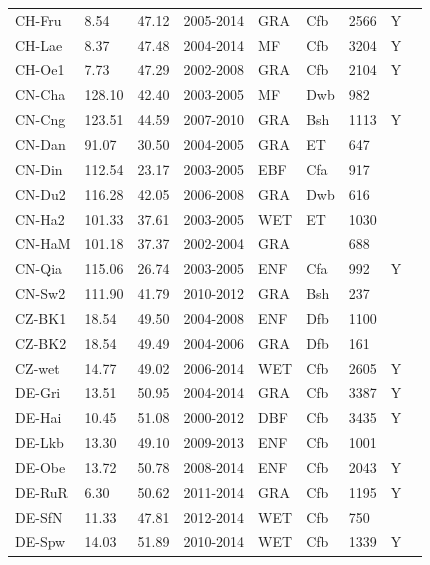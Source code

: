 \documentclass{myreport}
\begin{document}
\begin{longtable}{lllllllll}
  CH-Fru & 8.54 & 47.12 & 2005-2014 & GRA & Cfb & 2566 & Y & \cite{CH-Fru} \\ 
  CH-Lae & 8.37 & 47.48 & 2004-2014 & MF & Cfb & 3204 & Y & \cite{CH-Lae} \\ 
  CH-Oe1 & 7.73 & 47.29 & 2002-2008 & GRA & Cfb & 2104 & Y & \cite{CH-Oe1} \\ 
  CN-Cha & 128.10 & 42.40 & 2003-2005 & MF & Dwb & 982 &  & \cite{CN-Cha} \\ 
  CN-Cng & 123.51 & 44.59 & 2007-2010 & GRA & Bsh & 1113 & Y & \cite{CN-Cng} \\ 
  CN-Dan & 91.07 & 30.50 & 2004-2005 & GRA & ET & 647 &  & \cite{CN-Dan} \\ 
  CN-Din & 112.54 & 23.17 & 2003-2005 & EBF & Cfa & 917 &  & \cite{CN-Din} \\ 
  CN-Du2 & 116.28 & 42.05 & 2006-2008 & GRA & Dwb & 616 &  & \cite{CN-Du2} \\ 
  CN-Ha2 & 101.33 & 37.61 & 2003-2005 & WET & ET & 1030 &  & \cite{CN-Ha2} \\ 
  CN-HaM & 101.18 & 37.37 & 2002-2004 & GRA &  & 688 &  & \cite{CN-HaM} \\ 
  CN-Qia & 115.06 & 26.74 & 2003-2005 & ENF & Cfa & 992 & Y & \cite{CN-Qia} \\ 
  CN-Sw2 & 111.90 & 41.79 & 2010-2012 & GRA & Bsh & 237 &  & \cite{CN-Sw2} \\ 
  CZ-BK1 & 18.54 & 49.50 & 2004-2008 & ENF & Dfb & 1100 &  & \cite{CZ-BK1} \\ 
  CZ-BK2 & 18.54 & 49.49 & 2004-2006 & GRA & Dfb & 161 &  & \cite{CZ-BK2} \\ 
  CZ-wet & 14.77 & 49.02 & 2006-2014 & WET & Cfb & 2605 & Y & \cite{CZ-wet} \\ 
  DE-Gri & 13.51 & 50.95 & 2004-2014 & GRA & Cfb & 3387 & Y & \cite{DE-Gri} \\ 
  DE-Hai & 10.45 & 51.08 & 2000-2012 & DBF & Cfb & 3435 & Y & \cite{DE-Hai} \\ 
  DE-Lkb & 13.30 & 49.10 & 2009-2013 & ENF & Cfb & 1001 &  & \cite{DE-Lkb} \\ 
  DE-Obe & 13.72 & 50.78 & 2008-2014 & ENF & Cfb & 2043 & Y & \cite{DE-Obe} \\ 
  DE-RuR & 6.30 & 50.62 & 2011-2014 & GRA & Cfb & 1195 & Y & \cite{DE-RuR} \\ 
  DE-SfN & 11.33 & 47.81 & 2012-2014 & WET & Cfb & 750 &  & \cite{DE-SfN} \\ 
  DE-Spw & 14.03 & 51.89 & 2010-2014 & WET & Cfb & 1339 & Y & \cite{DE-Spw} \\ 

\end{longtable}
\end{document}

